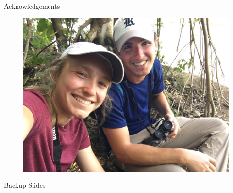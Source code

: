 \documentclass[]{beamer}
\begin{document}
\begin{frame}[noframenumbering]{Acknowledgements}
\begin{figure}
\begin{minipage}{0.49\linewidth}
			\includegraphics[width=0.8\linewidth,trim={0em 30em 0em 0em},clip]{Images/ack/IMG_5132.jpg}
		\end{minipage}
	\end{figure}
\end{frame}

\begin{frame}[noframenumbering]
	\Large
	\centering
	Backup Slides
	\normalsize
\end{frame}
\end{document}
